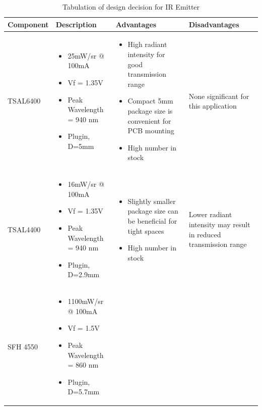 \documentclass[class=report,11pt,crop=false]{standalone}
\begin{document}
\begin{table}[h]
  \begin{center}
    \caption{Tabulation of design decision for IR Emitter}
    \label{tab:IR emitters}
    \begin{tabular}{|>{\centering\arraybackslash}m{2cm}|m{3.5cm}|m{5cm}|m{6.5cm}|}
      \hline
      \textbf{Component} & \textbf{Description} & \textbf{Advantages} & \textbf{Disadvantages}\\   
      \hline
      TSAL6400 & 
      \begin{itemize}
      \item 25mW/sr @ 100mA 
      \item Vf = 1.35V 
      \item Peak Wavelength = 940 nm 
      \item Plugin, D=5mm 
      \end{itemize} &
      \begin{itemize}
      \item High radiant intensity for good transmission range 
      \item Compact 5mm package size is convenient for PCB mounting 
      \item High number in stock 
      \end{itemize} &
      None significant for this application \\
      \hline
      TSAL4400 & 
      \begin{itemize}
      \item 16mW/sr @ 100mA 
      \item Vf = 1.35V 
      \item Peak Wavelength = 940 nm 
      \item Plugin, D=2.9mm 
      \end{itemize} &
      \begin{itemize}
      \item Slightly smaller package size can be beneficial for tight spaces 
      \item High number in stock 
      \end{itemize} &
      Lower radiant intensity may result in reduced transmission range \\
      \hline 
      SFH 4550 & 
      \begin{itemize}
      \item 1100mW/sr @ 100mA 
      \item Vf = 1.5V 
      \item Peak Wavelength = 860 nm 
      \item Plugin, D=5.7mm  

\end{itemize}
\end{tabular}
\end{center}
\end{table}
\end{document}
